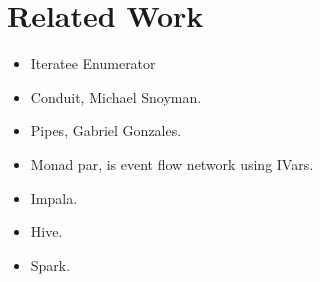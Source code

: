 \clearpage{}
\section{Related Work}

\begin{itemize}
\item Iteratee Enumerator
\item Conduit, Michael Snoyman.
\item Pipes, Gabriel Gonzales.
\item Monad par, is event flow network using IVars.
\item Impala.
\item Hive.
\item Spark.
\end{itemize}






